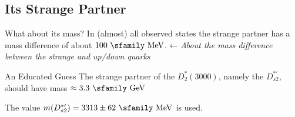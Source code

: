 \documentclass[professionalfonts,aspectratio=169]{beamer}
\begin{document}
\subsection{Its Strange Partner}

\begin{frame}{What about its mass?}
  In (almost) all observed states the strange partner has a mass difference 
  of about $100 \ \text{\sfamily MeV}$. ← \emph{About the mass difference between 
  the strange and up/down quarks}
  \pause
  \begin{block}{An Educated Guess}
  \vspace{0pt}
    The strange partner of the $D^*_2(3000)$, namely the $D^{* \prime}_{s 2}$, should have mass $ \approx 3.3 \ \text{\sfamily GeV}$

    The value $m(D^{* \prime}_{s 2}) = 3313 \pm 62 \ \text{\sfamily MeV}$ is used.
  \end{block}
\end{frame}
\end{document}
